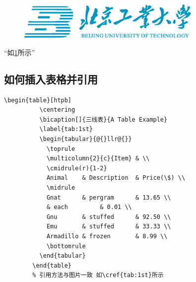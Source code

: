 \begin{figure}[htpb]
  \centering
  \includegraphics[width=0.8\textwidth]{bjut_logo_color.pdf}
  \label{fig:logo}
\end{figure}
“如\cref{fig:logo}所示”

\subsection{如何插入表格并引用}

\begin{center}
  \begin{minipage}{0.95\textwidth}
    \small
    \begin{Verbatim}[frame=single]
        \begin{table}[htpb]
          \centering
          \bicaption[]{三线表}{A Table Example}
          \label{tab:1st}
          \begin{tabular}{@{}llr@{}}
            \toprule
            \multicolumn{2}{c}{Item} & \\
            \cmidrule(r){1-2}
            Animal    & Description  & Price(\$) \\
            \midrule
            Gnat      & pergram      & 13.65 \\
            & each         & 0.01 \\
            Gnu       & stuffed      & 92.50 \\
            Emu       & stuffed      & 33.33 \\
            Armadillo & frozen       & 8.99 \\
            \bottomrule
          \end{tabular}
        \end{table}
        % 引用方法与图片一致 如\cref{tab:1st}所示
    \end{Verbatim}
  \end{minipage}
\end{center}

